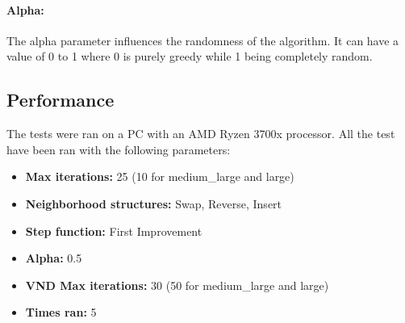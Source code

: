 \documentclass{article}
\begin{document}
\paragraph{Alpha:}
The alpha parameter influences the randomness of the algorithm. It can have a value of 0 to 1 where 0 is purely greedy while 1 being completely random.

\subsection*{Performance}
The tests were ran on a PC with an AMD Ryzen 3700x processor. All the test have been ran with the following parameters: 
\begin{itemize}
	\item \textbf{Max iterations:} 25 (10 for medium\_large and large)
	\item \textbf{Neighborhood structures:} Swap, Reverse, Insert
	\item \textbf{Step function:} First Improvement
	\item \textbf{Alpha:} 0.5
	\item \textbf{VND Max iterations:} 30 (50 for medium\_large and large)
	\item \textbf{Times ran:} 5
\end{itemize}
\end{document}
